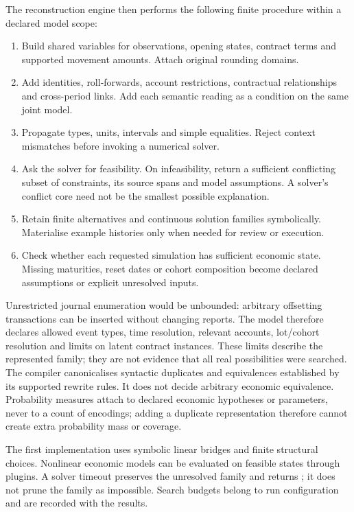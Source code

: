 The reconstruction engine then performs the following finite procedure within
a declared model scope:
\begin{enumerate}
\item Build shared variables for observations, opening states, contract terms
and supported movement amounts. Attach original rounding domains.
\item Add identities, roll-forwards, account restrictions, contractual
relationships and cross-period links. Add each semantic reading as a condition
on the same joint model.
\item Propagate types, units, intervals and simple equalities. Reject context
mismatches before invoking a numerical solver.
\item Ask the solver for feasibility. On infeasibility, return a sufficient
conflicting subset of constraints, its source spans and model assumptions.
A solver's conflict core need not be the smallest possible explanation.
\item Retain finite alternatives and continuous solution families symbolically.
Materialise example histories only when needed for review or execution.
\item Check whether each requested simulation has sufficient economic state.
Missing maturities, reset dates or cohort composition become declared
assumptions or explicit unresolved inputs.
\end{enumerate}

Unrestricted journal enumeration would be unbounded: arbitrary offsetting
transactions can be inserted without changing reports. The model therefore
declares allowed event types, time resolution, relevant accounts, lot/cohort
resolution and limits on latent contract instances. These limits describe the
represented family; they are not evidence that all real possibilities were
searched. The compiler canonicalises syntactic duplicates and equivalences
established by its supported rewrite rules. It does not decide arbitrary
economic equivalence. Probability measures attach to declared economic
hypotheses or parameters, never to a count of encodings; adding a duplicate
representation therefore cannot create extra probability mass or coverage.

The first implementation uses symbolic linear bridges and finite structural
choices. Nonlinear economic models can be evaluated on feasible states through
plugins. A solver timeout preserves the unresolved family and returns
; it does not prune the family as impossible. Search
budgets belong to run configuration and are recorded with the results.

